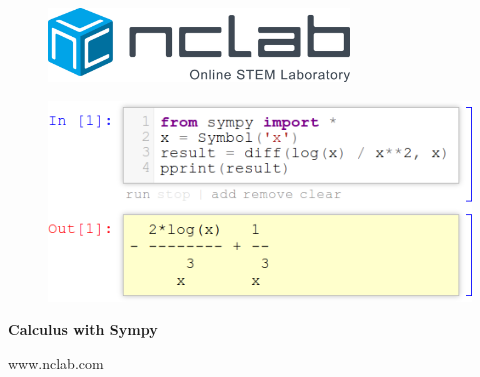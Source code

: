 \documentclass{article}
\begin{document}
\large

\vbox{}
\begin{figure}[!ht]
\includegraphics[width=8cm]{img/logo.png}
\vspace{29mm}
\end{figure}

\begin{figure}[!ht]
\begin{center}
\hspace{-20mm}
\includegraphics[width=14cm]{img/intro-frontpage.png}
\vspace{29mm}
\end{center}
\end{figure}

\centerline{\Huge \bf Calculus with Sympy}

\vfill

\centerline{\Large www.nclab.com}

\newpage




\section*{}
%

\end{document}
